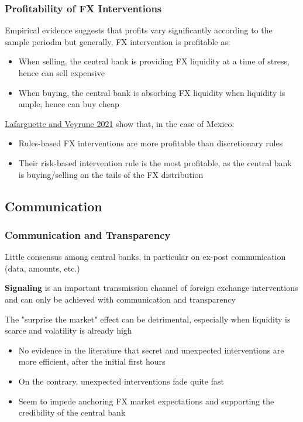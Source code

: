 \documentclass{beamer}
\newenvironment{wideitemize}{\itemize\addtolength{\itemsep}{10pt}}{\enditemize}
\begin{document}
\begin{frame}
  \frametitle{Profitability of FX Interventions}
  \begin{wideitemize}

  \item Empirical evidence suggests that profits vary significantly according to the sample periodm but generally, FX intervention is profitable as:
    \begin{itemize}
    \item When selling, the central bank is providing FX liquidity at a time of stress, hence can sell expensive
    \item When buying, the central bank is absorbing FX liquidity when liquidity is ample, hence can buy cheap
    \end{itemize}
  \item \href{https://www.imf.org/en/Publications/WP/Issues/2021/02/12/Foreign-Exchange-Intervention-Rules-for-Central-Banks-A-Risk-based-Framework-50081}{Lafarguette and Veyrune 2021} show that, in the case of Mexico:
    \begin{itemize}
    \item Rules-based FX interventions are more profitable than discretionary rules
    \item Their risk-based intervention rule is the most profitable, as the central bank is buying/selling on the tails of the FX distribution
    \end{itemize}    
  \end{wideitemize}  
\end{frame}


\subsection{Communication}
\begin{frame}
  \frametitle{Communication and Transparency}
  \begin{wideitemize}
  \item Little consensus among central banks, in particular on ex-post communication (data, amounts, etc.)
  \item \textbf{Signaling} is an important transmission channel of foreign exchange interventions and can only be achieved with communication and transparency
  \item The "surprise the market" effect can be detrimental, especially when liquidity is scarce and volatility is already high
    \begin{itemize}
    \item No evidence in the literature that secret and unexpected interventions are more efficient, after the initial first hours
    \item On the contrary, unexpected interventions fade quite fast
    \item Seem to impede anchoring FX market expectations and supporting the credibility of the central bank
    \end{itemize}    
  \end{wideitemize}
\end{frame}
\end{document}

